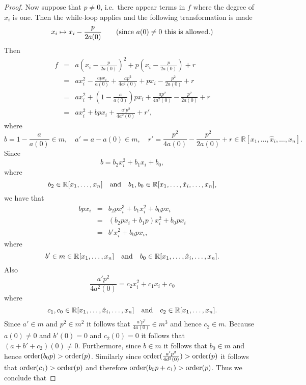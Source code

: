 \documentclass{amsproc}
\begin{document}
\begin{proof}
Now suppose that $p\neq 0$, i.e.~there appear terms in $f$ where the degree of $x_i$ is one. Then the while-loop applies and the following transformation is made 
\begin{equation}\label{eq3}
x_i\mapsto x_i-\frac{p}{2a(0)}\qquad \textnormal{(since }a(0)\neq 0\textnormal{ this is allowed.)}
\end{equation}
Then
\begin{eqnarray*}
f&=&a(x_i-\frac{p}{2a(0)})^2+p(x_i-\frac{p}{2a(0)})+r\\
&=&ax_i^2-\frac{apx_i}{a(0)}+\frac{ap^2}{4a^2(0)}+px_i-\frac{p^2}{2a(0)}+r\\
&=&ax_i^2+(1-\frac{a}{a(0)})px_i+\frac{ap^2}{4a^2(0)}-\frac{p^2}{2a(0)}+r\\
&=&ax_i^2+bpx_i+\frac{a'p^2}{4a^2(0)}+r',
\end{eqnarray*}
where 
\begin{equation*}
b=1-\frac{a}{a(0)}\in m,\quad a'=a-a(0)\in m,\quad r'=\frac{p^2}{4a(0)}-\frac{p^2}{2a(0)}+r\in\mathbb R[x_1,\ldots,\hat x_i,\ldots,x_n].
\end{equation*}
Since 
\begin{equation*}
b=b_2x_i^2+b_1x_i+b_0,
\end{equation*}
where
\begin{equation*}
b_2\in\mathbb R[x_1,\ldots,x_n] \quad\textnormal{and}\quad b_1,b_0\in\mathbb R[x_1,\ldots,\hat x_i,\ldots,x_n],
\end{equation*}
we have that 
\begin{eqnarray*}
bpx_i&=&b_2px_i^3+b_1x_i^2+b_0px_i\\
&=&(b_2px_i+b_1p)x_i^2+b_0px_i\\
&=&b'x_i^2+b_0px_i,
\end{eqnarray*}
where
\begin{equation*}
b'\in m\in\mathbb R[x_1,\ldots,x_n]\quad\textnormal{and}\quad b_0\in\mathbb R[x_1,\ldots,\hat x_i,\ldots,x_n]. 
\end{equation*}
Also
\begin{equation*}
\frac{a'p^2}{4a^2(0)}=c_2x_i^2+c_1x_i+c_0
\end{equation*}
where
\begin{equation*}
c_1,c_0\in\mathbb R[x_1,\ldots,\hat x_i,\ldots,x_n]\quad\textnormal{and}\quad c_2\in\mathbb R[x_1,\ldots,x_n].
\end{equation*}
Since $a'\in m$ and $p^2\in m^2$ it follows that $\frac{a'p^2}{4a(0)}\in m^3$ and hence $c_2\in m$. Because $a(0)\neq 0$ and $b'(0)=0$ and $c_2(0)=0$ it follows that $(a+b'+c_2)(0)\neq 0$. Furthermore, since $b\in m$ it follows that $b_0\in m$ and hence $\textnormal{order}(b_0p)>\textnormal{order}(p)$. Similarly since $\textnormal{order}(\frac{a'p^2}{4d^2(0)})>\textnormal{order}(p)$ it follows that $\textnormal{order}(c_1)>\textnormal{order}(p)$ and therefore $\textnormal{order}(b_0p+c_1)>\textnormal{order}(p)$. Thus we conclude that

\end{proof}
\end{document}
